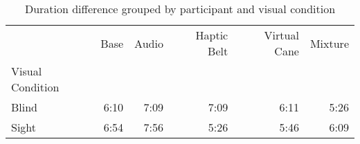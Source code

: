 
\begin{table}[!htb]
\centering
\caption{Duration difference grouped by participant and visual condition}
\label{tab:duracao_min_average_group}
\begin{tabular}{lrrrrr}
\toprule
{} &  Base & Audio & Haptic Belt & Virtual Cane & Mixture \\
Visual Condition &       &       &             &              &         \\
\midrule
Blind            &  6:10 &  7:09 &        7:09 &         6:11 &    5:26 \\
Sight            &  6:54 &  7:56 &        5:26 &         5:46 &    6:09 \\
\bottomrule
\end{tabular}
\end{table}

